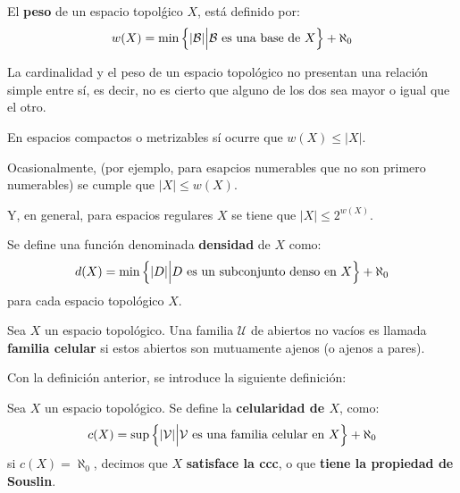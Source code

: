 \documentclass[12pt]{report}
\theoremstyle{largebreak}
\newcommand\abs[1]{\ensuremath{\lvert#1\rvert}}
\begin{document}
    \begin{mydef}
        El \textbf{peso} de un espacio topolǵico $X$, está definido por:
        \begin{equation*}
            w(X)=\min\left\{\abs{\mathcal{B}}\Big|\mathcal{B}\textup{ es una base de }X \right\}+\aleph_0
        \end{equation*}
    \end{mydef}

    \begin{obs}
        La cardinalidad y el peso de un espacio topológico no presentan una relación simple entre sí, es decir, no es cierto que alguno de los dos sea mayor o igual que el otro.

        En espacios compactos o metrizables sí ocurre que $w(X)\leq\abs{X}$.

        Ocasionalmente, (por ejemplo, para esapcios numerables que no son primero numerables) se cumple que $\abs{X}\leq w(X)$.

        Y, en general, para espacios regulares $X$ se tiene que $\abs{X}\leq 2^{w(X)}$.
    \end{obs}

    \begin{mydef}
        Se define una función denominada \textbf{densidad} de $X$ como:
        \begin{equation*}
            d(X)=\min\left\{\abs{D}\Big|D\textup{ es un subconjunto denso en }X \right\}+\aleph_0
        \end{equation*}
        para cada espacio topológico $X$.
    \end{mydef}

    \begin{mydef}
        Sea $X$ un espacio topológico. Una familia $\mathcal{U}$ de abiertos no vacíos es llamada \textbf{familia celular} si estos abiertos son mutuamente ajenos (o ajenos a pares).
    \end{mydef}

    Con la definición anterior, se introduce la siguiente definición:

    \begin{mydef}
        Sea $X$ un espacio topológico. Se define la \textbf{celularidad de $X$}, como:
        \begin{equation*}
            c(X)=\sup\left\{\abs{\mathcal{V}}\Big|\mathcal{V}\textup{ es una familia celular en }X \right\}+\aleph_0
        \end{equation*}
        si $c(X)=\aleph_0$, decimos que $X$ \textbf{satisface la ccc}, o que \textbf{tiene la propiedad de Souslin}.
    \end{mydef}
\end{document}
